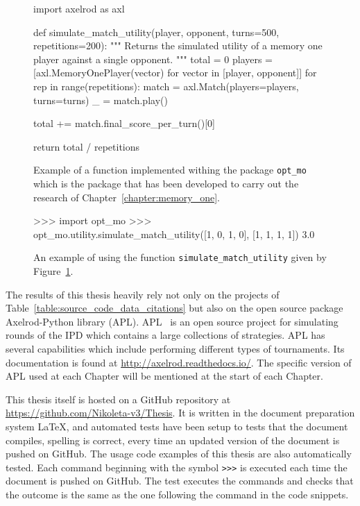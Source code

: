 \begin{figure}[htbp]
\begin{sourcepy}
import axelrod as axl

def simulate_match_utility(player, opponent, turns=500, repetitions=200):
    """
    Returns the simulated utility of a memory one player against a single opponent.
    """
    total = 0
    players = [axl.MemoryOnePlayer(vector) for vector in [player, opponent]]
    for rep in range(repetitions):
        match = axl.Match(players=players, turns=turns)
        _ = match.play()

        total += match.final_score_per_turn()[0]

    return total / repetitions
\end{sourcepy}
\caption{Example of a function implemented withing the package
\texttt{opt_mo} which is the package that has been developed to
carry out the research of Chapter~\ref{chapter:memory_one}.}\label{figure:source_code_example}
\end{figure}

\begin{figure}[htbp]
\begin{usagepy}
>>> import opt_mo
>>> opt_mo.utility.simulate_match_utility([1, 0, 1, 0], [1, 1, 1, 1])
3.0

\end{usagepy}
\caption{An example of using the function \texttt{simulate_match_utility}
given by Figure~\ref{figure:source_code_example}.}\label{figure:usage_code_example}
\end{figure}

The results of this thesis heavily rely not only on the projects of
Table~\ref{table:source_code_data_citations} but also on the open source package
Axelrod-Python library (APL). APL~\cite{axelrodproject} is an open source
project for simulating rounds of the IPD which contains a large collections of
strategies. APL has several capabilities which include performing different
types of tournaments. Its documentation is found at
\url{http://axelrod.readthedocs.io/}. The specific version of APL used at each
Chapter will be mentioned at the start of each Chapter.

This thesis itself is hosted on a GitHub repository at
\url{https://github.com/Nikoleta-v3/Thesis}. It is written in the document
preparation system \LaTeX, and automated tests have been setup to tests
that the document compiles, spelling is correct, every time
an updated version of the document is pushed on GitHub. The usage code examples
of this thesis are also automatically tested. Each command beginning with the
symbol \texttt{>>>} is executed each time the document is pushed on GitHub.
The test executes the commands and checks that the outcome is the
same as the one following the command in the code snippets.

